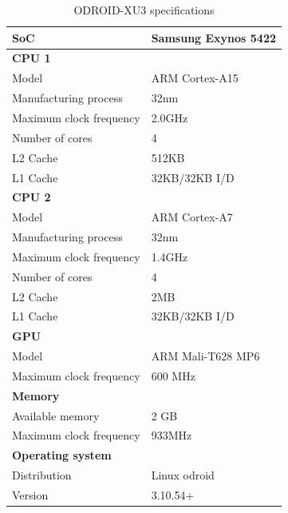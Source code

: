 \begin{table}[H]
  \centering
  \begin{tabular}{ll}
    \toprule
    \textbf{SoC}              & Samsung Exynos 5422 \\
    \midrule
    \textbf{CPU 1}            &  \\
    Model                     & ARM Cortex-A15 \\
    Manufacturing process     & 32nm \\
    Maximum clock frequency   & 2.0GHz \\
    Number of cores           & 4 \\
    L2 Cache                  & 512KB \\
    L1 Cache                  & 32KB/32KB I/D \\
    \midrule
    \textbf{CPU 2}            &  \\
    Model                     & ARM Cortex-A7 \\
    Manufacturing process     & 32nm \\
    Maximum clock frequency   & 1.4GHz \\
    Number of cores           & 4 \\
    L2 Cache                  & 2MB \\
    L1 Cache                  & 32KB/32KB I/D \\
    \midrule
    \textbf{GPU}              &  \\
    Model                     & ARM Mali-T628 MP6 \\
    Maximum clock frequency   & 600 MHz \\
    \midrule
    \textbf{Memory}           &  \\
    Available memory          & 2 GB \\
    Maximum clock frequency   & 933MHz \\
    \midrule
    \textbf{Operating system} &  \\
    Distribution              & Linux odroid \\
    Version                   & 3.10.54+ \\
    \bottomrule
  \end{tabular}
  \caption{ODROID-XU3 specifications\label{ODROIDspec}}
\end{table}

